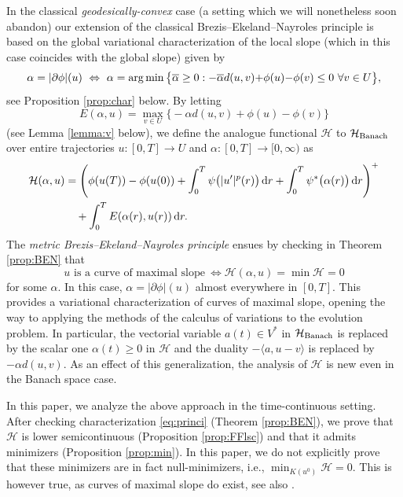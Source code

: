 \documentclass[reqno]{amsart}
\newcommand{\dr}{{\rm d} r}
\newcommand{\ove}{\overline}
\DeclareMathOperator*{\argmin}{{\rm arg\,min}}
\renewcommand{\sl}{|\partial \phi|}
\newcommand{\HH}{{\mathcal H}}
\begin{document}
In the
classical {\it geodesically-convex} case  (a setting which we will nonetheless
soon abandon)
  our extension of the classical Brezis--Ekeland--Nayroles principle  is 
based on the global variational characterization of the local slope (which in this case coincides with the global slope) given by
\begin{equation} \alpha = \sl(u) \ \Leftrightarrow \  \alpha =\argmin \big\{\ove
  \alpha \geq 0 :  -\ove \alpha d(u,v){+}\phi(u){-}\phi(v) \leq 0\  \forall v \in
  U\big\},\label{eq:introchar}
\end{equation}
see Proposition
\ref{prop:char} below.
By letting $$ E(\alpha,u) = \max_{v\in U} \big\{- \alpha
d(u,v)+\phi(u)-\phi(v) \big\}$$ (see Lemma \ref{lemma:v} below),  we
define the analogue functional $\HH$ to $ \HH_{\rm Banach}$ over entire trajectories $u:[0,T]\to
U$ and $\alpha: [0,T]\to [0,\infty)$ as
\begin{align*}
    \HH(\alpha,u) &=
       \left(\phi(u(T))-\phi(u(0)) +\int_0^T \psi\big( |u'|^p(r)\big)\,\dr + \int_0^T  \psi^*\big(\alpha(r)\big)\,\dr\right)^+ \\
  &\quad  +  \int_0^T E
                            (\alpha(r),u(r))\, \dr.
\end{align*}
The {\it metric Brezis--Ekeland--Nayroles principle}
ensues by checking in Theorem \ref{prop:BEN} that 
\begin{equation}
  \boxed{\text{$u$ is a curve of maximal slope} \ \Leftrightarrow  \HH(\alpha ,u)
  = \min\HH=0}
  \label{eq:princi}
  \end{equation}
 for some $\alpha$. In this case, $\alpha =\sl(u)$ almost
  everywhere in $[0,T]$. This provides a variational characterization
  of curves of maximal slope, opening the way to applying the methods
  of the calculus of variations  to the evolution problem.  In particular,
the vectorial variable $a(t)\in V^*$ in $\HH_{\rm Banach}$ is replaced by the scalar one
$\alpha(t)\geq 0$ in $\HH$ and the duality $ -\langle a,u-v
\rangle$ is replaced by  $-\alpha d(u,v)$. As  an  effect of this generalization, the
analysis of $\HH$ is new even in the Banach space case.
  
  In
  this paper, we  analyze the above approach in the time-continuous
  setting.   After checking 
  characterization \eqref{eq:princi} (Theorem \ref{prop:BEN}),
we prove that $\HH$ is
  lower semicontinuous (Proposition \ref{prop:FFlsc}) and that it
  admits minimizers (Proposition \ref{prop:min}).  In this paper, we do not explicitly prove that these minimizers are in fact null-minimizers, i.e., $\min_{K(u^0)}\HH=0$. This is however true, as curves of maximal slope do exist, see also \cite{cuore3}. 
\end{document}

